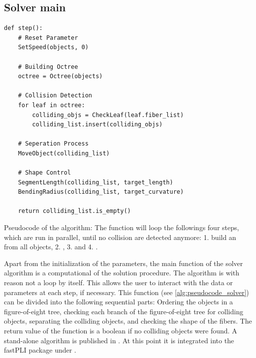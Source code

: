\subsection{Solver main}
%
\begin{lstfloat}[!tb]
\lstset{style=python}
\begin{lstlisting}[]
def step():
    # Reset Parameter
    SetSpeed(objects, 0)
   
    # Building Octree
    octree = Octree(objects)
   
    # Collision Detection
    for leaf in octree:
        colliding_objs = CheckLeaf(leaf.fiber_list)
        colliding_list.insert(colliding_objs)

    # Seperation Process
    MoveObject(colliding_list)

    # Shape Control
    SegmentLength(colliding_list, target_length)
    BendingRadius(colliding_list, target_curvature)

    return colliding_list.is_empty()
\end{lstlisting}
\caption{Pseudocode of the  algorithm: The function  will loop the followings four steps, which are run in parallel, until no collision are detected anymore: 1. build an  from all objects, 2. , 3.  and 4. . }
\label{alg:pseudocode_solver}
\end{lstfloat}
%
Apart from the initialization of the parameters, the main function of the solver algorithm is a computational  of the solution procedure.
The algorithm is with reason not a loop by itself.
This allows the user to interact with the data or parameters at each step, if necessary.
This  function (see \cref{alg:pseudocode_solver}) can be divided into the following sequential parts:
Ordering the objects in a figure-of-eight tree, checking each branch of the figure-of-eight tree for colliding objects, separating the colliding objects, and checking the shape of the fibers.
The return value of the function is a boolean if no colliding objects were found.
A stand-alone algorithm is published in \cite{Matuschke2019}.
At this point it is integrated into the \ac{fastPLI} package under .
%
%
%
